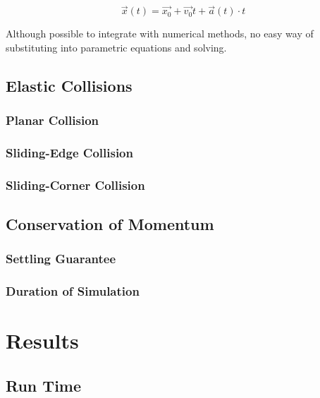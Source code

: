 $$
\vec{x}(t) = \vec{x_0} + \vec{v_0}t + \vec{a}(t) \cdot t
$$

Although possible to integrate with numerical methods, no easy way of substituting into parametric equations and solving.


	\subsection{Elastic Collisions}

		\subsubsection{Planar Collision}

		\subsubsection{Sliding-Edge Collision}

		\subsubsection{Sliding-Corner Collision}

	\subsection{Conservation of Momentum}

		\subsubsection{Settling Guarantee}

		\subsubsection{Duration of Simulation}



\section{Results}

	\subsection{Run Time}

